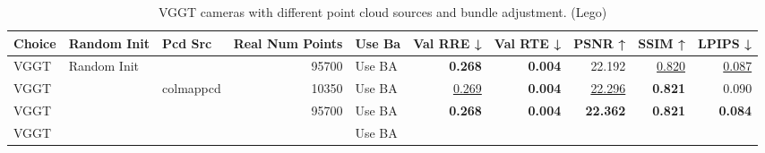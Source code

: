 \begin{table}[H]
\caption{VGGT cameras with different point cloud sources and bundle adjustment. (Lego)}
\label{tab:06_isolated_cams_vggt_ba_lego}
\begin{tabular}{lllrlrrrrr}
\toprule
Choice & Random Init & Pcd Src & Real Num Points & Use Ba & Val RRE ↓ & Val RTE ↓ & PSNR ↑ & SSIM ↑ & LPIPS ↓ \\
\midrule
VGGT & Random Init &  & 95700 & Use BA & \textbf{0.268} & \textbf{0.004} & 22.192 & \underline{0.820} & \underline{0.087} \\
VGGT &  & colmappcd & 10350 & Use BA & \underline{0.269} & \textbf{0.004} & \underline{22.296} & \textbf{0.821} & 0.090 \\
VGGT &  &  & 95700 & Use BA & \textbf{0.268} & \textbf{0.004} & \textbf{22.362} & \textbf{0.821} & \textbf{0.084} \\
VGGT &  &  &  & Use BA &  &  &  &  &  \\
\bottomrule
\end{tabular}
\end{table}

